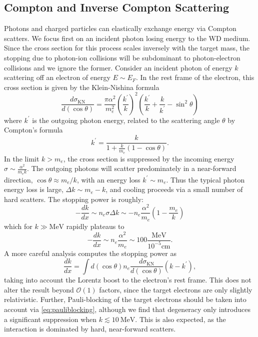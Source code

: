 \documentclass[twocolumn,showpacs,preprintnumbers,amsmath,amssymb,prd]{revtex4}
\newcommand{\OO}{\mathcal{O}}
\newcommand{\MeV}{\text{MeV}}
\newcommand{\cm}{\text{cm}}
\def\r{\right)}
\def\l{\left(}
\begin{document}
\begin{appendices}
\subsection*{Compton and Inverse Compton Scattering}
Photons and charged particles can elastically exchange energy via Compton scatters.
We focus first on an incident photon losing energy to the WD medium.
Since the cross section for this process scales inversely with the target mass, the stopping due to photon-ion collisions will be subdominant to photon-electron collisions and we ignore the former. 
Consider an incident photon of energy $k$ scattering off an electron of energy $E \sim E_F$.
In the rest frame of the electron, this cross section is given by the Klein-Nishina formula
\begin{equation}
\label{KN}
  \frac{d\sigma_\text{KN}}{d (\cos \theta)} = \frac{\pi \alpha^2}{m_e^2} 
  \l \frac{k^\prime}{k} \r^2 
  \l \frac{k^\prime}{k} + \frac{k}{k^\prime} -\sin^2 \theta \r
\end{equation}
where $k^\prime$ is the outgoing photon energy, related to the scattering angle $\theta$ by Compton's formula
\begin{equation}
{k^{\prime }={\frac {k}{1+{\frac {k}{m_e}}(1-\cos \theta )}}}.
\end{equation}
In the limit $k > m_e$, the cross section is suppressed by the incoming energy $\sigma \sim \frac{\alpha^2}{m_e k}$. 
The outgoing photons will scatter predominately in a near-forward direction, $\cos \theta \approx m_e/k$, with an energy loss $k^\prime \sim m_e$.
Thus the typical photon energy loss is large, $\Delta k \sim m_e - k$, and cooling proceeds via a small number of hard scatters.
The stopping power is roughly:
\begin{equation}
\label{eq:approx-comptonSP}
  -\frac{dk}{dx} \sim n_e \sigma \Delta{k} 
  \sim-n_e \frac{\alpha^2}{m_e} \l 1 - \frac{m_e}{k} \r
\end{equation}
which for $k \gg \MeV$ rapidly plateaus to
\begin{equation}
\label{eq:plateau-comptonSP}
  -\frac{dk}{dx} \sim n_e \frac{\alpha^2}{m_e} 
   \sim 100 \frac{\MeV}{10^{-5} \cm}.
\end{equation}
A more careful analysis computes the stopping power as 
\begin{equation}
\label{eq:comptonSP}
  \frac{dk}{dx} =  \int d (\cos \theta) n_e \frac{d\sigma_\text{KN}}{d (\cos \theta)} \l k - k^\prime \r, 
\end{equation}
taking into account the Lorentz boost to the electron's rest frame.
This does not alter the result beyond $\OO(1)$ factors, since the target electrons are only slightly relativistic.
Further, Pauli-blocking of the target electrons should be taken into account via \eqref{eq:pauliblocking}, although we find that degeneracy only introduces a significant suppression when $k \lesssim 10 ~\text{MeV}$.
This is also expected, as the interaction is dominated by hard, near-forward scatters.


\end{appendices}
\end{document}
